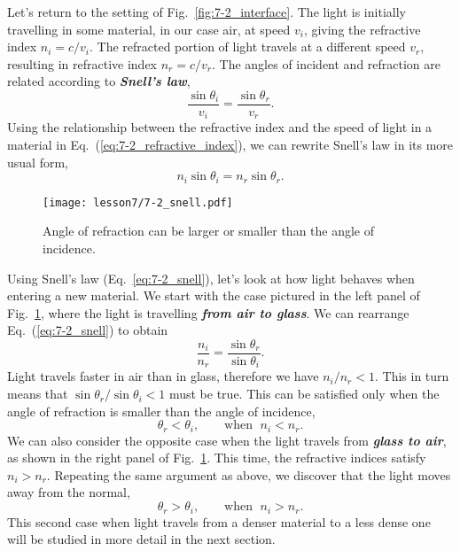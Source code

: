 Let's return to the setting of Fig.~\ref{fig:7-2_interface}.
The light is initially travelling in some material, in our case air, at speed $v_i$, giving the refractive index $n_i = c / v_i$.
The refracted portion of light travels at a different speed $v_r$, resulting in refractive index $n_r = c / v_r$.
The angles of incident and refraction are related according to \textit{\textbf{Snell's law}},
\begin{equation}
    \frac{\sin\theta_i}{v_i} = \frac{\sin\theta_r}{v_r}.
\end{equation}
Using the relationship between the refractive index and the speed of light in a material in Eq.~(\ref{eq:7-2_refractive_index}), we can rewrite Snell's law in its more usual form,
\begin{equation}
    n_i \sin \theta_i = n_r \sin \theta_r.
    \label{eq:7-2_snell}
\end{equation}

\begin{figure}
    \centering
    \texttt{[image: lesson7/7-2\_snell.pdf]}
    \caption[Snell's law]{Angle of refraction can be larger or smaller than the angle of incidence.}
    \label{fig:7-2_snell_law}
\end{figure}

Using Snell's law (Eq.~\ref{eq:7-2_snell}), let's look at how light behaves when entering a new material.
We start with the case pictured in the left panel of Fig.~\ref{fig:7-2_snell_law}, where the light is travelling \textit{\textbf{from air to glass}}.
We can rearrange Eq.~(\ref{eq:7-2_snell}) to obtain
\begin{equation}
    \frac{n_i}{n_r} = \frac{\sin\theta_r}{\sin\theta_i}.
\end{equation}
Light travels faster in air than in glass, therefore we have $n_i / n_r < 1$.
This in turn means that $\sin\theta_r / \sin\theta_i < 1$ must be true.
This can be satisfied only when the angle of refraction is smaller than the angle of incidence,
\begin{equation}
    \theta_r < \theta_i, \qquad \text{when } \; n_i < n_r.
\end{equation}
We can also consider the opposite case when the light travels from \textit{\textbf{glass to air}}, as shown in the right panel of Fig.~\ref{fig:7-2_snell_law}.
This time, the refractive indices satisfy $n_i > n_r$.
Repeating the same argument as above, we discover that the light moves away from the normal,
\begin{equation}
    \theta_r > \theta_i, \qquad \text{when } \; n_i > n_r.
\end{equation}
This second case when light travels from a denser material to a less dense one will be studied in more detail in the next section.

